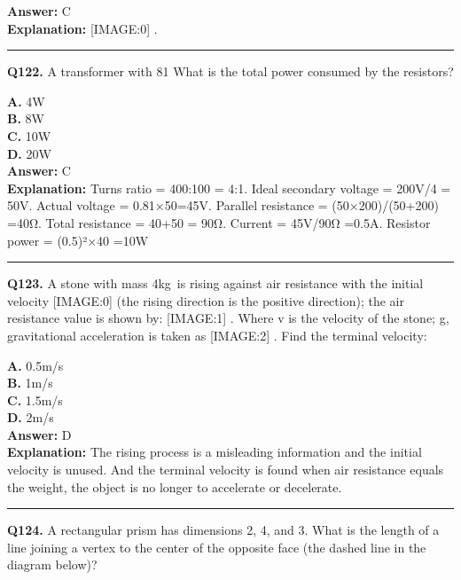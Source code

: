 \documentclass[12pt]{article}
\begin{document}
\textbf{Answer:} C \\
\textbf{Explanation:} [IMAGE:0]
.

\hrule
\vspace{1em}


\noindent
\textbf{Q122.} A transformer with 81%
What is the total power consumed by the resistors?



\textbf{A.} 4W \\
\textbf{B.} 8W \\
\textbf{C.} 10W \\
\textbf{D.} 20W \\

\textbf{Answer:} C \\
\textbf{Explanation:} Turns ratio = 400:100 = 4:1. Ideal secondary voltage = 200V/4 = 50V. Actual voltage = \sqrt{}0.81×50=45V. Parallel resistance = (50×200)/(50+200) =40Ω. Total resistance = 40+50 = 90Ω. Current = 45V/90Ω =0.5A. Resistor power = (0.5)²×40 =10W

\hrule
\vspace{1em}


\noindent
\textbf{Q123.} A stone with mass 4kg is rising against air resistance with the initial velocity
[IMAGE:0]
(the rising direction is the positive direction); the air resistance value is shown by:
[IMAGE:1]
.
Where v is the velocity of the stone; g, gravitational acceleration is taken as
[IMAGE:2]
. Find the terminal velocity:



\textbf{A.} 0.5m/s \\
\textbf{B.} 1m/s \\
\textbf{C.} 1.5m/s \\
\textbf{D.} 2m/s \\

\textbf{Answer:} D \\
\textbf{Explanation:} The rising process is a misleading information and the initial velocity is unused. And the terminal velocity is found when air resistance equals the weight, the object is no longer to accelerate or decelerate.

\hrule
\vspace{1em}


\noindent
\textbf{Q124.} A rectangular prism has dimensions 2, 4, and 3. What is the length of a line joining a vertex to the center of the opposite face (the dashed line in the diagram below)?
\end{document}
